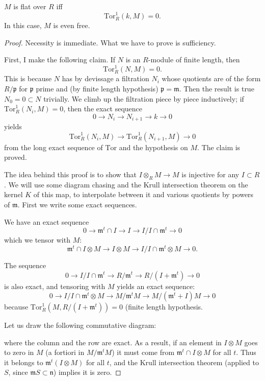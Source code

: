 \begin{theorem} $M$ is flat over $R$ iff
\[ \mathrm{Tor} ^1_R( k, M) = 0.\]
In this case, $M$ is even free.
\end{theorem}

\begin{proof} 
Necessity is immediate.  What we have to prove is sufficiency.

First, I make the following claim. If $N$ is an $R$-module of finite length, then
\[ \mathrm{Tor} ^1_R( N, M)=0.\]
This is because $N$ has by devissage a filtration $N_i$ whose quotients are of the form $R/\mathfrak{p}$ for $\mathfrak{p}$ prime and (by finite length hypothesis) $\mathfrak{p}= \mathfrak{m}$.  
Then the result is true $N_0=0 \subset N$ trivially.  We climb up the filtration piece by piece inductively; if $\mathrm{Tor} ^1_R(N_i, M)=0$, then the exact sequence
\[ 0 \to N_i \to N_{i+1} \to k \to 0 \]
yields
\[ \mathrm{Tor} ^1_R(N_i, M) \to \mathrm{Tor} ^1_R(N_{i+1}, M) \to 0 \]
from the long exact sequence of $\mathrm{Tor} $ and the hypothesis on $M$.
The claim is proved.


The idea behind this proof is to show that $I \otimes_RM \to M$ is injective for any $I \subset R$.  We will use some diagram chasing and the Krull intersection theorem on the kernel $K$ of this map, to interpolate between it and various quotients by powers of $\mathfrak{m}$.
First we write some exact sequences.

We have an exact sequence
\[ 0 \to \mathfrak{m}^t \cap I \to I \to I/I \cap \mathfrak{m}^t \to 0\]
which we tensor with $M$:
\[   \mathfrak{m}^t \cap I \otimes M \to I \otimes M \to I/I \cap \mathfrak{m}^t \otimes M \to 0.\]

The sequence
\[ 0 \to  I/I  \cap \mathfrak{m}^t \to R/\mathfrak{m}^t \to R/(I+\mathfrak{m}^t) \to 0\]
is also exact, and tensoring with $M$ yields an exact sequence:
\[ 0 \to  I/I  \cap \mathfrak{m}^t \otimes M  \to M/\mathfrak{m}^tM  \to M/(\mathfrak{m}^t  + I) M \to 0\]
because $\mathrm{Tor} ^1_R(M,   R/(I+\mathfrak{m}^t))=0$ (finite length hypothesis.


Let us draw the following commutative diagram:\\

where the column and the row are exact.
As a result, if an element in $I \otimes M$ goes to zero in $M$ (a fortiori in  $M/\mathfrak{m}^tM$) it must come from $\mathfrak{m}^t \cap I \otimes M$ for all $t$.  Thus it belongs to $\mathfrak{m}^t(I \otimes M)$ for all $t$, and the Krull intersection theorem (applied to $S$, since $\mathfrak{m}S \subset \mathfrak{n}$) implies it is zero.

\end{proof} 

